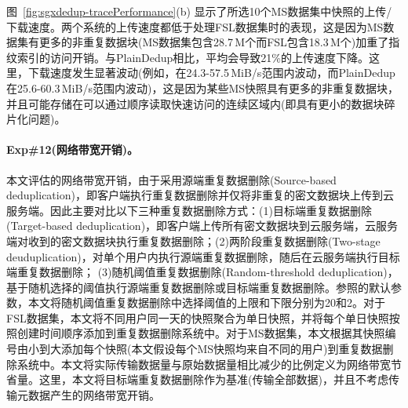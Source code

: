 图~\ref{fig:sgxdedup-tracePerformance}(b) 显示了所选10个MS数据集中快照的上传/下载速度。两个系统的上传速度都低于处理FSL数据集时的表现，这是因为MS数据集有更多的非重复数据块(MS数据集包含28.7\,M个而FSL包含18.3\,M个)加重了指纹索引的访问开销。与PlainDedup相比，\sysnameS 平均会导致21\%的上传速度下降。这里，下载速度发生显著波动(例如，\sysnameS 在24.3-57.5\,MiB/s范围内波动，而PlainDedup在25.6-60.3\,MiB/s范围内波动)，这是因为某些MS快照具有更多的非重复数据块，并且可能存储在可以通过顺序读取快速访问的连续区域内(即具有更小的数据块碎片化问题\cite{lillibridge13})。

\paragraph*{Exp\#12(网络带宽开销)。} 本文评估\sysnameS 的网络带宽开销，由于\sysnameS 采用源端重复数据删除(Source-based deduplication)，即客户端执行重复数据删除并仅将非重复的密文数据块上传到云服务端。因此主要对比以下三种重复数据删除方式：(1)目标端重复数据删除(Target-based deduplication)，即客户端上传所有密文数据块到云服务端，云服务端对收到的密文数据块执行重复数据删除；(2)两阶段重复数据删除(Two-stage deuduplication)\cite{li15}，对单个用户内执行源端重复数据删除，随后在云服务端执行目标端重复数据删除； (3)随机阈值重复数据删除(Random-threshold deduplication)\cite{harnik2010side}，基于随机选择的阈值执行源端重复数据删除或目标端重复数据删除。参照\cite{harnik2010side}的默认参数，本文将随机阈值重复数据删除中选择阈值的上限和下限分别为20和2。对于FSL数据集，本文将不同用户同一天的快照聚合为单日快照，并将每个单日快照按照创建时间顺序添加到重复数据删除系统中。对于MS数据集，本文根据其快照编号由小到大添加每个快照(本文假设每个MS快照均来自不同的用户)到重复数据删除系统中。本文将实际传输数据量与原始数据量相比减少的比例定义为网络带宽节省量。这里，本文将目标端重复数据删除作为基准(传输全部数据)，并且不考虑传输元数据产生的网络带宽开销。

